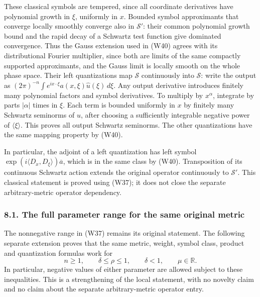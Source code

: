 \documentclass[
  11pt,
]{article}
\begin{document}
These classical symbols are tempered, since all coordinate derivatives
have polynomial growth in \(\xi\), uniformly in \(x\). Bounded symbol
approximants that converge locally smoothly converge also in
\(\mathcal S'\): their common polynomial growth bound and the rapid
decay of a Schwartz test function give dominated convergence. Thus the
Gauss extension used in (W40) agrees with its distributional Fourier
multiplier, since both are limits of the same compactly supported
approximants, and the Gauss limit is locally smooth on the whole phase
space. Their left quantizations map \(\mathcal S\) continuously into
\(\mathcal S\): write the output as
\((2\pi)^{-n}\int e^{ix\cdot\xi}a(x,\xi)\widehat u(\xi)\,d\xi\). Any
output derivative introduces finitely many polynomial factors and symbol
derivatives. To multiply by \(x^\alpha\), integrate by parts
\(|\alpha|\) times in \(\xi\). Each term is bounded uniformly in \(x\)
by finitely many Schwartz seminorms of \(u\), after choosing a
sufficiently integrable negative power of \(\langle\xi\rangle\). This
proves all output Schwartz seminorms. The other quantizations have the
same mapping property by (W40).

In particular, the adjoint of a left quantization has left symbol
\(\exp(i\langle D_x,D_\xi\rangle)\overline a\), which is in the same
class by (W40). Transposition of its continuous Schwartz action extends
the original operator continuously to \(\mathcal S'\). This classical
statement is proved using (W37); it does not close the separate
arbitrary-metric operator dependency.

\subsubsection{8.1. The full parameter range for the same original
metric}\label{the-full-parameter-range-for-the-same-original-metric}

The nonnegative range in (W37) remains its original statement. The
following separate extension proves that the same metric, weight, symbol
class, product and quantization formulas work for \[
 n\geq1,\qquad \delta\leq\rho\leq1,\qquad\delta<1,\qquad
 \mu\in\mathbb R.
 \tag{WX1}
\] In particular, negative values of either parameter are allowed
subject to these inequalities. This is a strengthening of the local
statement, with no novelty claim and no claim about the separate
arbitrary-metric operator entry.
\end{document}
